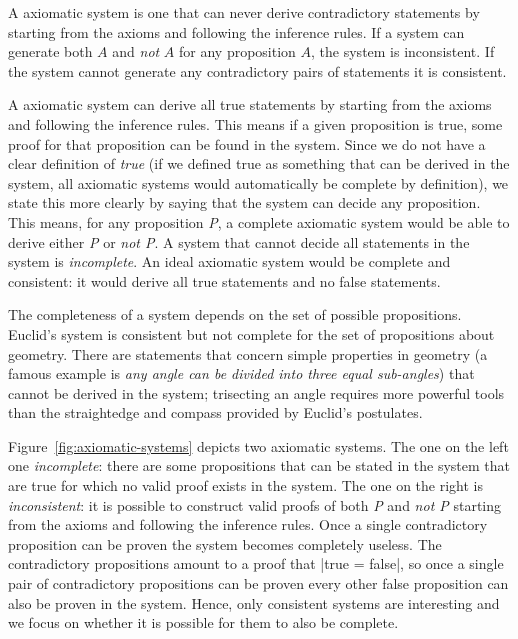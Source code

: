 \begin{schemeregion}
A  axiomatic system is one that can never derive contradictory statements by starting from the axioms and following the inference rules. If a system can generate both $A$ and \emph{not} $A$ for any proposition $A$, the system is inconsistent.  If the system cannot generate any contradictory pairs of statements it is consistent.  %

A  axiomatic system can derive all true statements by starting from the axioms and following the inference rules.  This means if a given proposition is true, some proof for that proposition can be found in the system.  Since we do not have a clear definition of \emph{true} (if we defined true as something that can be derived in the system, all axiomatic systems would automatically be complete by definition), we state this more clearly by saying that the system can decide any proposition.  This means, for any proposition \emph{P}, a complete axiomatic system would be able to derive either \emph{P} or \emph{not P}.  A system that cannot decide all statements in the system is \emph{incomplete}.  	An ideal axiomatic system would be complete and consistent: it would derive all true statements and no false statements.  

The completeness of a system depends on the set of possible propositions.  Euclid's system is consistent but not complete for the set of propositions about geometry.  There are statements that concern simple properties in geometry (a famous example is \emph{any angle can be divided into three equal sub-angles}) that cannot be derived in the system; trisecting an angle requires more powerful tools than the straightedge and compass provided by Euclid's postulates.

Figure~\ref{fig:axiomatic-systems} depicts two axiomatic systems.  The one on the left one \emph{incomplete}: there are some propositions that can be stated in the system that are true for which no valid proof exists in the system.  The one on the right is \emph{inconsistent}: it is possible to construct valid proofs of both \emph{P} and \emph{not P} starting from the axioms and following the inference rules.  Once a single contradictory proposition can be proven the system becomes completely useless.  The contradictory propositions amount to a proof that \scheme|true = false|, so once a single pair of contradictory propositions can be proven every other false proposition can also be proven in the system.  Hence, only consistent systems are interesting and we focus on whether it is possible for them to also be complete.


\end{schemeregion}
